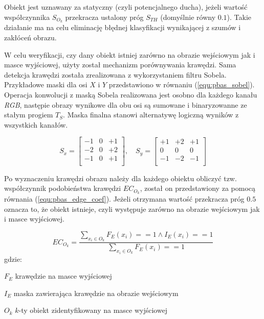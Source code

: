 \noindent Obiekt jest uznawany za statyczny (czyli potencjalnego ducha), jeżeli wartość współczynnika $S_{O_k}$ przekracza ustalony próg $S_{TH}$ (domyślnie równy $0.1$). 
Takie działanie ma na celu eliminację błędnej klasyfikacji wynikającej z szumów i zakłóceń obrazu.


W celu weryfikacji, czy dany obiekt istniej zarówno na obrazie wejściowym jak i masce wyjściowej, użyty został mechanizm porównywania krawędzi.
Sama detekcja krawędzi została zrealizowana z wykorzystaniem filtru Sobela. 
Przykładowe maski dla osi $X$ i $Y$ przedstawiono w równaniu (\ref{equ:pbas_sobel}). 
Operacja konwolucji z maską Sobela realizowana jest osobno dla każdego kanału \textit{RGB}, następie obrazy wynikowe dla obu osi są sumowane i binaryzowanne ze stałym progiem $T_S$. 
Maska finalna stanowi alternatywę logiczną wyników z wszystkich kanałów.

    \begin{equation}
        S_x = \begin{bmatrix}
			    -1 & 0 & +1 \\
			    -2 & 0 & +2 \\
			    -1 & 0 & +1 \\
		    \end{bmatrix}
		,\quad 
		S_y = \begin{bmatrix}
			    +1 & +2 & +1 \\
			    0 & 0 & 0 \\
			    -1 & -2 & -1 \\
		    \end{bmatrix} 
    \label{equ:pbas_sobel}
    \end{equation}

Po wyznaczeniu krawędzi obrazu należy dla każdego obiektu obliczyć tzw. współczynnik podobieństwa krawędzi $EC_{O_k}$, został on przedstawiony za pomocą równania (\ref{equ:pbas_edge_coef}).  
Jeżeli otrzymana wartość przekracza próg $0.5$ oznacza to, że obiekt istnieje, czyli występuje zarówno na obrazie wejściowym jak i masce wyjściowej. 

    \begin{equation}
        EC_{O_k} = \frac{ \sum_{x_i \in O_k} F_E(x_i) == 1 \land I_E(x_i) == 1 }{ \sum_{x_i \in O_k} F_E(x_i) == 1 }
    \label{equ:pbas_edge_coef}
    \end{equation}
gdzie:
\begin{eqwhere}[2.2cm]
	\item[$F_E$] krawędzie na masce wyjściowej
	\item[$I_E$] maska zawierająca krawędzie na obrazie wejściowym
	\item[$O_k$] $k$-ty obiekt zidentyfikowany na masce wyjściowej
\end{eqwhere}

